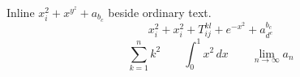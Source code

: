 \documentclass[12pt,letterpaper]{article}
\begin{document}
Inline $x_i^2+x^{y^z}+a_{b_c}$ beside ordinary text.
\[
 x_i^2 + x^2_i + T_{ij}^{kl} + e^{-x^2} + a^{b_c}_{d^e}
\]
\[
 \sum_{k=1}^{n} k^2 \qquad \int_0^1 x^2\,dx \qquad \lim_{n\to\infty} a_n
\]
\end{document}
